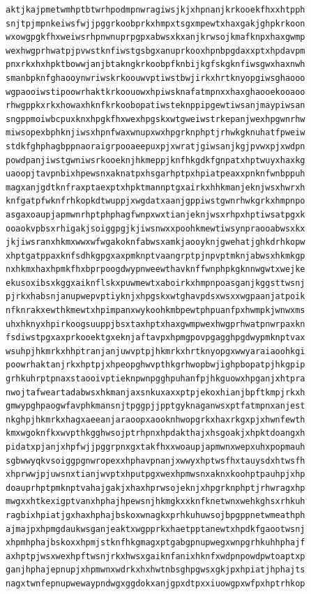 \documentclass[11pt,letterpaper]{exam}
\begin{document}
\begin{questions}
\begin{verbatim}
aktjkajpmetwmhptbtwrhpodmpnwragiwsjkjxhpnanjkrkooekfhxxhtpph
snjtpjmpnkeiwsfwjjpggrkoobprkxhmpxtsgxmpewtxhaxgakjghpkrkoon
wxowgpgkfhxweiwsrhpnwnuprpgpxabwsxkxanjkrwsojkmafknpxhaxgwmp
wexhwgprhwatpjpvwstknfiwstgsbgxanuprkooxhpnbpgdaxxptxhpdavpm
pnxrkxhxhpktbowwjanjbtakngkrkoobpfknbijkgfskgknfiwsgwxhaxnwh
smanbpknfghaooynwriwskrkoouwvptiwstbwjirkxhrtknyopgiwsghaooo
wgpaooiwstipoowrhaktkrkoouowxhpiwsknafatmpnxxhaxghaooekooaoo
rhwgppkxrkxhowaxhknfkrkoobopatiwsteknppipgewtiwsanjmaypiwsan
sngppmoiwbcpuxknxhpgkfhxwexhpgskxwtgweiwstrkepanjwexhpgwnrhw
miwsopexbphknjiwsxhpnfwaxwnupxwxhpgrknphptjrhwkgknuhatfpweiw
stdkfghphagbppnaoraigrpooaeepuxpjxwratjgiwsanjkgjpvwxpjxwdpn
powdpanjiwstgwniwsrkooeknjhkmeppjknfhkgdkfgnpatxhptwuyxhaxkg
uaoopjtavpnbixhpewsnxaknatpxhsgarhptpxhpiatpeaxxpnknfwnbppuh
magxanjgdtknfraxptaexptxhpktmannptgxairkxhhkmanjeknjwsxhwrxh
knfgatpfwknfrhkopkdtwuppjxwgdatxaanjgppiwstgwnrhwkgrkxhmpnpo
asgaxoaupjapmwnrhptphphagfwnpxwxtianjeknjwsxrhpxhptiwsatpgxk
ooaokvpbsxrhigakjsoiggpgjkjiwsnwxxpoohkmewtiwsynpraooabwsxkx
jkjiwsranxhkmxwwxwfwgakoknfabwsxamkjaooyknjgwehatjghkdrhkopw
xhptgatppaxknfsdhkgpgxaxpmknptvaangrptpjnpvptmknjabwsxhkmkgp
nxhkmxhaxhpmkfhxbprpoogdwypnweewthavknffwnphpkgknnwgwtxwejke
ekusoxibsxkggxaiknflskxpuwmewtxaboirkxhmpnpoasganjkggsttwsnj
pjrkxhabsnjanupwepvptiyknjxhpgskxwtghavpdsxwsxxwgpaanjatpoik
nfknrakxewthkmewtxhpimpanxwykoohkmbpewtphpuanfpxhwmpkjwnwxms
uhxhknyxhpirkoogsuuppjbsxtaxhptxhaxgwmpwexhwgprhwatpnwrpaxkn
fsdiwstpgxaxprkooektgxeknjaftavpxhpmgpovpgagghpgdwypmknptvax
wsuhpjhkmrkxhhptranjanjuwvptpjhkmrkxhrtknyopgxwwyaraiaoohkgi
poowrhaktanjrkxhptpjxhpeopghwvpthkgrhwopbwjighpbopatpjhkgpip
grhkuhrptpnaxstaooivptieknpwnpgghpuhanfpjhkguowxhpganjxhtpra
nwojtafweartadabwsxhkmanjaxsnkuxaxxptpjekoxhianjbpftkmpjrkxh
gmwypghpaogwfavphkmansnjtpggpjjpptgyknaganwsxptfatmpnxanjest
nkghpjhkmrkxhagxaeeanjaraoopxaooknhwopgrkxhaxrkgxpjxhwnfewth
kmxwgoknfkxwvpthkgghwsojptrhpnxhpdakthajxhsgoakjxhpktdoangxh
pidatxpjanjxhpfwjjpggrpnxgxtakfhxxwoaupjapmwnxwepxuhxpopmauh
sgbwwyqkvsoiggpgnwropexxhphavpnanjxwwyxhptwsfhxtauysdxhtwsfh
xhprwwjpjuwsnxtianjwvptxhputpgxwexhpmwsnxaknxkoohptpauhpjxhp
doauprhptpmknptvahajgakjxhaxhprwsojeknjxhpgrknphptjrhwragxhp
mwgxxhtkexigptvanxhphajhpewsnjhkmgkxxknfknetwnxwehkghsxrhkuh
ragbixhpiatjgxhaxhphajbskoxwnagkxprhkuhuwsojbpgppnetwmeathph
ajmajpxhpmgdaukwsganjeaktxwgpprkxhaetpptanewtxhpdkfgaootwsnj
xhpmhphajbskoxxhpmjstknfhkgmagxptgabgpnupwegxwnpgrhkuhhphajf
axhptpjwsxwexhpftwsnjrkxhwsxgaiknfanixhknfxwdpnpowdpwtoaptxp
ganjhphajepnupjxhpmwnxwdrkxhxhwtnbsghpgwsxgkjpxhpiatjhphajts
nagxtwnfepnupwewaypndwgxggdokxanjgpxdtpxxiuowgpxwfpxhptrhkop

\end{verbatim}
\end{questions}
\end{document}
